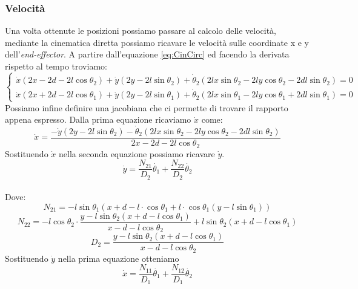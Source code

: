 \subsubsection{Velocità}\label{sec:CalcoloVelCin}
Una volta ottenute le posizioni possiamo passare al calcolo delle velocità, mediante la cinematica diretta possiamo ricavare le velocità sulle coordinate x e y dell'\textit{end-effector}. A partire dall'equazione \ref{eq:CinCirc} ed facendo la derivata rispetto al tempo troviamo:
\begin{equation*}
	\begin{cases}
	\dot{x}(2x-2d-2l\cos\theta_2) +\dot{y}(2y-2l\sin\theta_2) + \dot{\theta}_2(2lx\sin\theta_2-2ly\cos\theta_2-2dl\sin\theta_2)= 0 \\
	\dot{x}(2x+2d-2l\cos\theta_1) +\dot{y}(2y-2l\sin\theta_1) + \dot{\theta}_2(2lx\sin\theta_1-2ly\cos\theta_1+2dl\sin\theta_1)= 0
	\end{cases}
\end{equation*}
 Possiamo infine definire una jacobiana che ci permette di trovare il rapporto appena espresso. Dalla prima equazione ricaviamo $\dot{x}$ come:
 \begin{equation*}
 	\dot{x} = \frac{-\dot{y}(2y-2l\sin\theta_2) -\dot{\theta}_2(2lx\sin\theta_2-2ly\cos\theta_2-2dl\sin\theta_2)}{2x-2d-2l\cos\theta_2}
 \end{equation*}
Sostituendo $\dot{x}$ nella seconda equazione possiamo ricavare $\dot{y}$.
\begin{equation*}
	\dot{y} = \frac{N_{21}}{D_2}\dot{\theta_1} + \frac{N_{22}}{D_2}\dot{\theta_2}
\end{equation*}
\\Dove:
\begin{equation*}
    N_{21} = -l\sin\theta_1 (x+d-l\cdot \cos\theta_1 + l\cdot \cos\theta_1 (y-l\sin\theta_1))
\end{equation*}
\begin{equation*}
    N_{22} = -l\cos\theta_2\cdot \frac{y-l\sin\theta_2 (x+d-l\cos\theta_1)}{x-d-l \cos\theta_2} +l\sin\theta_2(x+d-l\cos\theta_1)
\end{equation*}
\begin{equation*}
 D_2 = \frac{y-l\sin\theta_2 (x+d-l\cos\theta_1)}{x-d-l\cos\theta_2}
\end{equation*}
Sostituendo $\dot{y}$ nella prima equazione otteniamo 
\begin{equation*}
	\dot{x} = \frac{N_{11}}{D_1} \dot{\theta_1} + \frac{N_{12}}{D_1}\dot{\theta_2}
\end{equation*}

